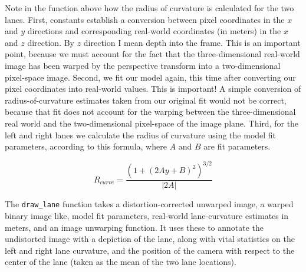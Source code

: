 \documentclass[11pt]{article}
\begin{document}
Note in the function above how the radius of curvature is
calculated for the two lanes.  First, constants establish a
conversion between pixel coordinates in the $x$ and $y$
directions and corresponding real-world coordinates (in meters)
in the $x$ and $z$ direction.  By $z$ direction I mean depth
into the frame.  This is an important point, because we must
account for the fact that the three-dimensional real-world image
has been warped by the perspective transform into a
two-dimensional pixel-space image.  Second, we fit our model
again, this time after converting our pixel coordinates into
real-world values.  This is important!  A simple conversion of
radius-of-curvature estimates taken from our original fit would
not be correct, because that fit does not account for the
warping between the three-dimensional real world and the
two-dimensional pixel-space of the image plane.  Third, for the
left and right lanes we calculate the radius of curvature using
the model fit parameters, according to this formula, where $A$
and $B$ are fit parameters.

\[ R_{curve} = \frac{\left(1 + \left(2 A y +
      B\right)^2\right)^{3/2}}{\left| 2 A \right|} \]

The \texttt{draw\_lane} function takes a distortion-corrected unwarped
image, a warped binary image like, model fit parameters,
real-world lane-curvature estimates in meters, and an image
unwarping function.  It uses these to annotate the undistorted
image with a depiction of the lane, along with vital statistics
on the left and right lane curvature, and the position of the
camera with respect to the center of the lane (taken as the mean
of the two lane locations).
\end{document}
